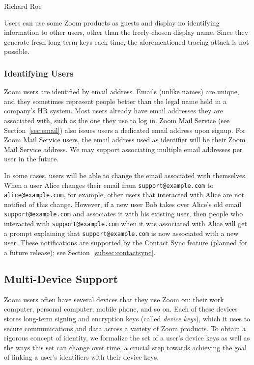 \begin{multicols}{2}
Richard Roe

\columnbreak

Users can use some Zoom products as guests and display no identifying information to other users,
other than the freely-chosen display name. Since they generate fresh long-term keys each time, the
aforementioned tracing attack is not possible.
\end{multicols}

\subsubsection{Identifying Users}

Zoom users are identified by email address. Emails (unlike names) are unique, and they
sometimes represent people better than the legal name held in a company's HR system. Most users
already have email addresses they are associated with, such as the one they use to log in. Zoom Mail
Service (see Section~\ref{sec:email}) also issues users a dedicated email address upon signup. For
Zoom Mail Service users, the email address used as identifier will be their Zoom Mail Service
address. We may support associating multiple email addresses per user in the future.

In some cases, users will be able to change the email associated with themselves. When a user Alice
changes their email from \texttt{support@example.com} to \texttt{alice@example.com}, for example,
other users that interacted with Alice are not notified of this change. However, if a new user Bob
takes over Alice's old email \texttt{support@example.com} and associates it with his existing user,
then people who interacted with \texttt{support@example.com} when it was associated with Alice will
get a prompt explaining that \texttt{support@example.com} is now associated with a new user. These
notifications are supported by the Contact Sync feature (planned for a future release); see
Section~\ref{subsec:contactsync}.

\subsection{Multi-Device Support}
\label{subsec:multidev}

Zoom users often have several devices that they use Zoom on: their work computer, personal computer,
mobile phone, and so on. Each of these devices stores long-term signing and encryption keys (called
\textit{device keys}), which it uses to secure communications and data across a variety of Zoom
products. To obtain a rigorous concept of identity, we formalize the set of a user's device keys as
well as the ways this set can change over time, a crucial step towards achieving the goal of linking
a user's identifiers with their device keys.

